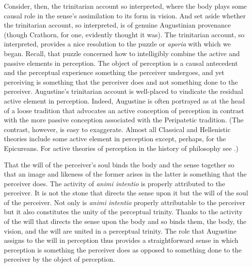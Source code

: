 \documentclass[12pt]{article}
\begin{document}
Consider, then, the trinitarian account so interpreted, where the body plays some causal role in the sense's assimilation to its form in vision. And set aside whether the trinitarian account, so interpreted, is of genuine Augustinian provenance (though Crathorn, for one, evidently thought it was). The trinitarian account, so interpreted, provides a nice resolution to the puzzle or \emph{aporia} with which we began. Recall, that puzzle concerned how to intelligibly combine the active and passive elements in perception. The object of perception is a causal antecedent and the perceptual experience something the perceiver undergoes, and yet perceiving is something that the perceiver does and not something done to the perceiver. Augustine's trinitarian account is well-placed to vindicate the residual active element in perception. Indeed, Augustine is often portrayed as at the head of a loose tradition that advocates an active conception of perception in contrast with the more passive conception associated with the Peripatetic tradition. (The contrast, however, is easy to exaggerate. Almost all Classical and Hellenistic theories include some active element in perception except, perhaps, for the Epicureans. For active theories of perception in the history of philosophy see \citealt{Silva:2014cl}.)

That the will of the perceiver's soul binds the body and the sense together so that an image and likeness of the former arises in the latter is something that the perceiver does. The activity of \emph{animi intentio} is properly attributed to the perceiver. It is not the stone that directs the sense upon it but the will of the soul of the perceiver. Not only is \emph{animi intentio} properly attributable to the perceiver but it also constitutes the unity of the perceptual trinity. Thanks to the activity of the will that directs the sense upon the body and so binds them, the body, the vision, and the will are united in a perceptual trinity. The role that Augustine assigns to the will in perception thus provides a straightforward sense in which perception is something the perceiver does as opposed to something done to the perceiver by the object of perception. 
\end{document}
